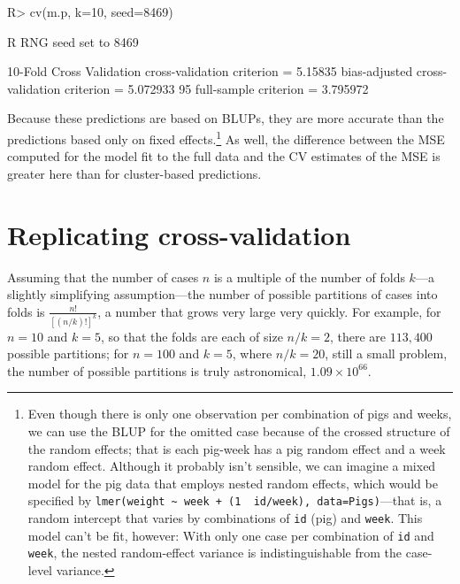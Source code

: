 \documentclass[
]{jss}
\begin{document}
\begin{CodeChunk}
\begin{CodeInput}
R> cv(m.p, k=10, seed=8469)
\end{CodeInput}
\begin{CodeOutput}
R RNG seed set to 8469
\end{CodeOutput}
\begin{CodeOutput}
10-Fold Cross Validation
cross-validation criterion = 5.15835
bias-adjusted cross-validation criterion = 5.072933
95%
full-sample criterion = 3.795972 
\end{CodeOutput}
\end{CodeChunk}

Because these predictions are based on BLUPs, they are more accurate
than the predictions based only on fixed effects.\footnote{Even though
  there is only one observation per combination of pigs and weeks, we
  can use the BLUP for the omitted case because of the crossed structure
  of the random effects; that is each pig-week has a pig random effect
  and a week random effect. Although it probably isn't sensible, we can
  imagine a mixed model for the pig data that employs nested random
  effects, which would be specified by
  \texttt{lmer(weight\ \textasciitilde{}\ week\ +\ (1\ \textbar{}\ id/week),\ data=Pigs)}---that
  is, a random intercept that varies by combinations of \texttt{id}
  (pig) and \texttt{week}. This model can't be fit, however: With only
  one case per combination of \texttt{id} and \texttt{week}, the nested
  random-effect variance is indistinguishable from the case-level
  variance.} As well, the difference between the MSE computed for the
model fit to the full data and the CV estimates of the MSE is greater
here than for cluster-based predictions.

\hypertarget{replicating-cross-validation}{%
\section{Replicating
cross-validation}\label{replicating-cross-validation}}

Assuming that the number of cases \(n\) is a multiple of the number of
folds \(k\)---a slightly simplifying assumption---the number of possible
partitions of cases into folds is \(\frac{n!}{[(n/k)!]^k}\), a number
that grows very large very quickly. For example, for \(n = 10\) and
\(k = 5\), so that the folds are each of size \(n/k = 2\), there are
\(113,400\) possible partitions; for \(n=100\) and \(k=5\), where
\(n/k = 20\), still a small problem, the number of possible partitions
is truly astronomical, \(1.09\times 10^{66}\).
\end{document}
